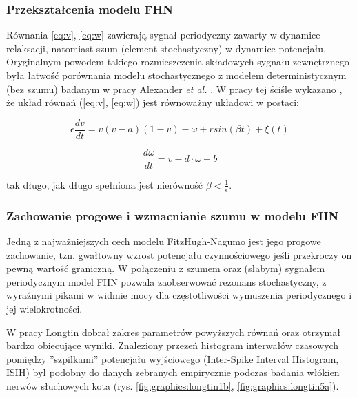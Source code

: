   \subsubsection{Przekształcenia modelu FHN}

  Równania \ref{eq:v}, \ref{eq:w} zawierają sygnał periodyczny zawarty w dynamice relaksacji, natomiast szum (element stochastyczny) w dynamice potencjału. Oryginalnym powodem takiego rozmieszczenia składowych sygnału zewnętrznego była łatwość porównania modelu stochastycznego z modelem deterministycznym (bez szumu) badanym w pracy Alexander \emph{et al.} \cite{alexander}. W pracy tej ściśle wykazano \cite{longtin}, że układ równań (\ref{eq:v}, \ref{eq:w}) jest równoważny układowi w postaci:

  \begin{equation}
    \epsilon \frac{dv}{dt} = v(v-a)(1-v)- \omega + r sin(\beta t) + \xi(t)
  \end{equation}

  \begin{equation}
    \frac{d \omega}{dt} = v - d \cdot \omega - b
  \end{equation}

  tak długo, jak długo spełniona jest nierówność $\beta < \frac{1}{\epsilon}$.

  \subsubsection{Zachowanie progowe i wzmacnianie szumu w modelu FHN}

  Jedną z najważniejszych cech modelu FitzHugh-Nagumo jest jego progowe zachowanie, tzn. gwałtowny wzrost potencjału czynnościowego jeśli przekroczy on pewną wartość graniczną. W połączeniu z szumem oraz (słabym) sygnałem periodycznym model FHN pozwala zaobserwować rezonans stochastyczny, z wyraźnymi pikami w widmie mocy dla częstotliwości wymuszenia periodycznego i jej wielokrotności.


  W pracy \cite{longtin} Longtin dobrał zakres parametrów powyższych równań oraz otrzymał bardzo obiecujące wyniki. Znaleziony przezeń histogram interwałów czasowych pomiędzy ''szpilkami'' potencjału wyjściowego (Inter-Spike Interval Histogram, ISIH) był podobny do danych zebranych empirycznie podczas badania włókien nerwów słuchowych kota (rys. \ref{fig:graphics:longtin1b}, \ref{fig:graphics:longtin5a}).

